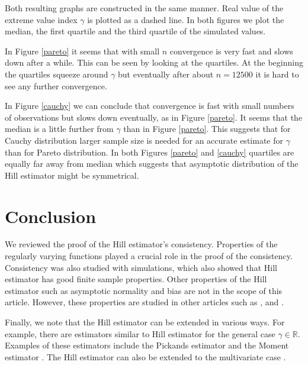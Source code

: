 \documentclass[english,12pt,a4paper,pdftex,sci,utf8]{aaltothesis} %
\begin{document}
Both resulting graphs are constructed in the same manner. Real value of the extreme value index $\gamma$  is plotted as a dashed line. In both figures we plot the median, the first quartile and the third quartile of the simulated values.

In Figure \ref{pareto} it seems that with small $n$ convergence is very fast and slows down after a while. This can be seen by looking at the quartiles. At the beginning the quartiles squeeze around $\gamma$ but eventually after about $n=12500$ it is hard to see any further convergence.

In Figure \ref{cauchy} we can conclude that convergence is fast with small numbers of observations but slows down eventually, as in Figure \ref{pareto}. It seems that the median is a little further from $\gamma$ than in Figure \ref{pareto}. This suggests that for Cauchy distribution larger sample size is needed for an accurate estimate for $\gamma$ than for Pareto distribution. In both Figures \ref{pareto} and \ref{cauchy} quartiles are equally far away from median which suggests that asymptotic distribution of the Hill estimator might be symmetrical.


\clearpage
\section{Conclusion}
\label{conclusion}

We reviewed the proof of the Hill estimator's consistency. Properties of the regularly varying functions played a crucial role in the proof of the consistency. Consistency was also studied with simulations, which also showed that Hill estimator has good finite sample properties. Other properties of the Hill estimator such as asymptotic normality and bias are not in the scope of this article. However, these properties are studied in other articles such as \cite{peng}, \cite{hausler} and \cite{haanResnick}.

Finally, we note that the Hill estimator can be extended in various ways. For example, there are estimators similar to Hill estimator for the general case $\gamma \in \mathbb{R}$. Examples of these estimators include the Pickands estimator \cite{pickands} and the Moment estimator \cite{dekkers}. The Hill estimator can also be extended to the multivariate case \cite{ilmonen}.

\clearpage





\thesisbibliography
\end{document}

